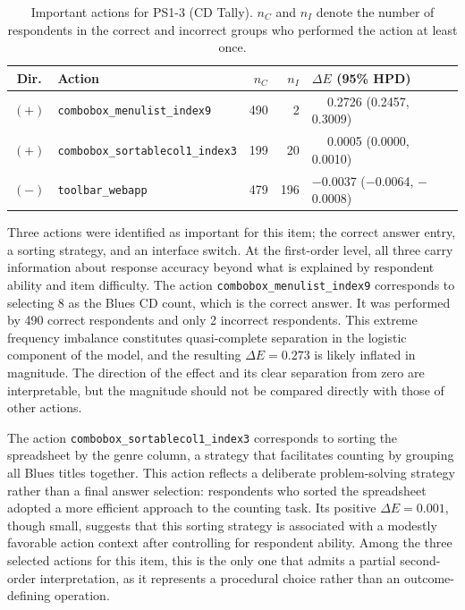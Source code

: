 \documentclass[A4paper,11pt]{article}
\begin{document}
\begin{table}[htb]
\centering
\caption{Important actions for PS1-3 (CD Tally). $n_C$ and $n_I$ denote the number of respondents in the correct and incorrect groups who performed the action at least once.}
\label{tab:ps13_actions}
\small
\begin{tabular}{clrrl}
\toprule
Dir. & Action & $n_C$ & $n_I$ & $\Delta E$ (95\% HPD) \\
\midrule
$(+)$ & \texttt{combobox\_menulist\_index9}     & 490 &   2 & $\phantom{-}$0.2726 (0.2457, 0.3009) \\
$(+)$ & \texttt{combobox\_sortablecol1\_index3} & 199 &  20 & $\phantom{-}$0.0005 (0.0000, 0.0010) \\
$(-)$ & \texttt{toolbar\_webapp}               & 479 & 196 & $-$0.0037 ($-$0.0064, $-$0.0008) \\
\bottomrule
\end{tabular}
\end{table}

Three actions were identified as important for this item; the correct answer entry, a sorting strategy, and an interface switch. At the first-order level, all three carry information about response accuracy beyond what is explained by respondent ability and item difficulty. The action \texttt{combobox\_menulist\_index9} corresponds to selecting 8 as the Blues CD count, which is the correct answer. It was performed by 490 correct respondents and only 2 incorrect respondents. This extreme frequency imbalance constitutes quasi-complete separation in the logistic component of the model, and the resulting $\Delta E = 0.273$ is likely inflated in magnitude. The direction of the effect and its clear separation from zero are interpretable, but the magnitude should not be compared directly with those of other actions.

The action \texttt{combobox\_sortablecol1\_index3} corresponds to sorting the spreadsheet by the genre column, a strategy that facilitates counting by grouping all Blues titles together. This action reflects a deliberate problem-solving strategy rather than a final answer selection: respondents who sorted the spreadsheet adopted a more efficient approach to the counting task. Its positive $\Delta E = 0.001$, though small, suggests that this sorting strategy is associated with a modestly favorable action context after controlling for respondent ability. Among the three selected actions for this item, this is the only one that admits a partial second-order interpretation, as it represents a procedural choice rather than an outcome-defining operation.
\end{document}

